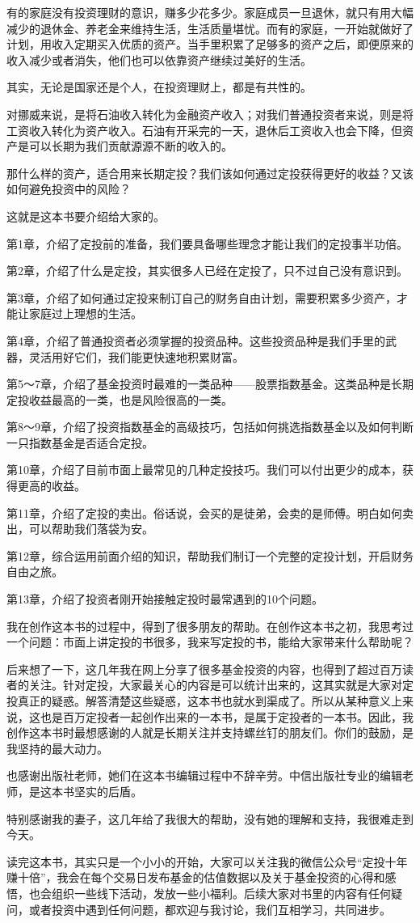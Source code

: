 有的家庭没有投资理财的意识，赚多少花多少。家庭成员一旦退休，就只有用大幅减少的退休金、养老金来维持生活，生活质量堪忧。而有的家庭，一开始就做好了计划，用收入定期买入优质的资产。当手里积累了足够多的资产之后，即便原来的收入减少或者消失，他们也可以依靠资产继续过美好的生活。

其实，无论是国家还是个人，在投资理财上，都是有共性的。

对挪威来说，是将石油收入转化为金融资产收入；对我们普通投资者来说，则是将工资收入转化为资产收入。石油有开采完的一天，退休后工资收入也会下降，但资产是可以长期为我们贡献源源不断的收入的。

那什么样的资产，适合用来长期定投？我们该如何通过定投获得更好的收益？又该如何避免投资中的风险？

这就是这本书要介绍给大家的。

第1章，介绍了定投前的准备，我们要具备哪些理念才能让我们的定投事半功倍。

第2章，介绍了什么是定投，其实很多人已经在定投了，只不过自己没有意识到。

第3章，介绍了如何通过定投来制订自己的财务自由计划，需要积累多少资产，才能让家庭过上理想的生活。

第4章，介绍了普通投资者必须掌握的投资品种。这些投资品种是我们手里的武器，灵活用好它们，我们能更快速地积累财富。

第5～7章，介绍了基金投资时最难的一类品种——股票指数基金。这类品种是长期定投收益最高的一类，也是风险很高的一类。

第8～9章，介绍了投资指数基金的高级技巧，包括如何挑选指数基金以及如何判断一只指数基金是否适合定投。

第10章，介绍了目前市面上最常见的几种定投技巧。我们可以付出更少的成本，获得更高的收益。

第11章，介绍了定投的卖出。俗话说，会买的是徒弟，会卖的是师傅。明白如何卖出，可以帮助我们落袋为安。

第12章，综合运用前面介绍的知识，帮助我们制订一个完整的定投计划，开启财务自由之旅。

第13章，介绍了投资者刚开始接触定投时最常遇到的10个问题。

我在创作这本书的过程中，得到了很多朋友的帮助。在创作这本书之初，我思考过一个问题：市面上讲定投的书很多，我来写定投的书，能给大家带来什么帮助呢？

后来想了一下，这几年我在网上分享了很多基金投资的内容，也得到了超过百万读者的关注。针对定投，大家最关心的内容是可以统计出来的，这其实就是大家对定投真正的疑惑。解答清楚这些疑惑，这本书也就水到渠成了。所以从某种意义上来说，这也是百万定投者一起创作出来的一本书，是属于定投者的一本书。因此，我创作这本书时最想感谢的人就是长期关注并支持螺丝钉的朋友们。你们的鼓励，是我坚持的最大动力。

也感谢出版社老师，她们在这本书编辑过程中不辞辛劳。中信出版社专业的编辑老师，是这本书坚实的后盾。

特别感谢我的妻子，这几年给了我很大的帮助，没有她的理解和支持，我很难走到今天。

读完这本书，其实只是一个小小的开始，大家可以关注我的微信公众号“定投十年赚十倍”，我会在每个交易日发布基金的估值数据以及关于基金投资的心得和感悟，也会组织一些线下活动，发放一些小福利。后续大家对书里的内容有任何疑问，或者投资中遇到任何问题，都欢迎与我讨论，我们互相学习，共同进步。
